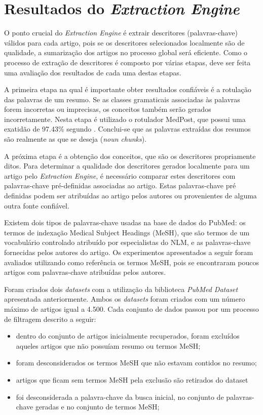 \section{Resultados do \emph{Extraction Engine}}

O ponto crucial do \emph{Extraction Engine} é extrair descritores (palavras-chave) válidos para cada artigo, pois se os descritores selecionados localmente são de qualidade, a sumarização dos artigos no processo global será eficiente. Como o processo de extração de descritores é composto por várias etapas, deve ser feita uma avaliação dos resultados de cada uma destas etapas.

A primeira etapa na qual é importante obter resultados confiáveis é a rotulação das palavras de um resumo. Se as classes gramaticais associadas às palavras forem incorretas ou imprecisas, os conceitos também serão gerados incorretamente.  Nesta etapa é utilizado o rotulador MedPost, que possui uma exatidão de 97.43\% segundo \cite{Smith2004}. Conclui-se que as palavras extraídas dos resumos são realmente as que se deseja (\emph{noun chunks}).

A próxima etapa é a obtenção dos conceitos, que são os descritores propriamente ditos. Para determinar a qualidade dos descritores gerados localmente para um artigo pelo \emph{Extraction Engine}, é necessário comparar estes descritores com palavras-chave pré-definidas associadas ao artigo. Estas palavras-chave pré definidas podem ser atribuídas ao artigo pelos autores ou provenientes de alguma outra fonte confiável. 

Existem dois tipos de palavras-chave usadas na base de dados do PubMed: os termos de indexação Medical Subject Headings (MeSH), que são termos de um vocabulário controlado atribuído por especialistas do NLM, e as palavras-chave fornecidas pelos autores do artigo. Os experimentos apresentados a seguir foram avaliados utilizando como referência os termos MeSH, pois se encontraram poucos artigos com palavras-chave atribuídas pelos autores.

Foram criados dois \emph{datasets} com a utilização da biblioteca \emph{PubMed Dataset} apresentada anteriormente. Ambos os \emph{datasets} foram criados com um número máximo de artigos igual a 4.500. Cada conjunto de dados passou por um processo de filtragem descrito a seguir:

\begin{itemize}
    \item dentro do conjunto de artigos inicialmente recuperados, foram excluídos aqueles artigos que não possuíam resumo ou termos MeSH;
    \item foram desconsiderados os termos MeSH que não estavam contidos no resumo;
    \item artigos que ficam sem termos MeSH pela exclusão são retirados do dataset
    \item foi desconsiderada a palavra-chave da busca inicial, no conjunto de palavras-chave geradas e no conjunto de termos MeSH;
\end{itemize}

